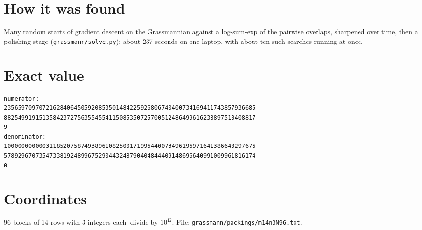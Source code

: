 \documentclass[11pt,a4paper]{article}
\begin{document}
\section{How it was found}
Many random starts of gradient descent on the Grassmannian against a log-sum-exp of the pairwise overlaps, sharpened over time, then a polishing stage (\texttt{grassmann/solve.py}); about 237 seconds on one laptop, with about ten such searches running at once.


\appendix
\section{Exact value}
{\small
\begin{verbatim}
numerator:
235659709707216284064505920853501484225926806740400734169411743857936685
882549919151358423727563554554115085350725700512486499616238897510408817
9
denominator:
100000000000311852075874938961082500171996440073496196971641386640297676
578929670735473381924899675290443248790404844409148696640991009961816174
0
\end{verbatim}}

\section{Coordinates}
96 blocks of 14 rows with 3 integers each; divide by $10^{12}$. File: \texttt{grassmann/packings/m14n3N96.txt}.
{\tiny
\begin{multicols}{3}
\end{multicols}}
\end{document}
